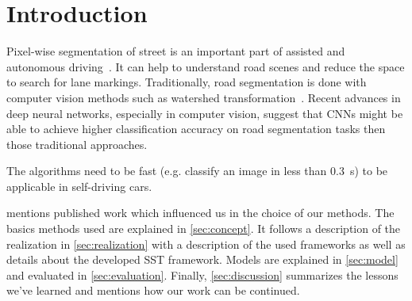 
\section{Introduction}
Pixel-wise segmentation of street is an important part of assisted and
autonomous driving~\cite{Tarel2009}. It can help to understand road scenes and
reduce the space to search for lane markings. Traditionally, road segmentation
is done with computer vision methods such as watershed
transformation~\cite{Beucher1990}. Recent advances in deep neural networks,
especially in computer vision, suggest that \glspl{CNN} might be able to
achieve higher classification accuracy on road segmentation tasks then those
traditional approaches.

The algorithms need to be fast (e.g. classify an image in less than
\SI{0.3}{\second}) to be applicable in self-driving cars.

 mentions published work which influenced us in the
choice of our methods. The basics methods used are explained in
\cref{sec:concept}. It follows a description of the realization in
\cref{sec:realization} with a description of the used frameworks as well as
details about the developed SST framework. Models are explained in
\cref{sec:model} and evaluated in \cref{sec:evaluation}. Finally,
\cref{sec:discussion} summarizes the lessons we've learned and mentions how
our work can be continued.